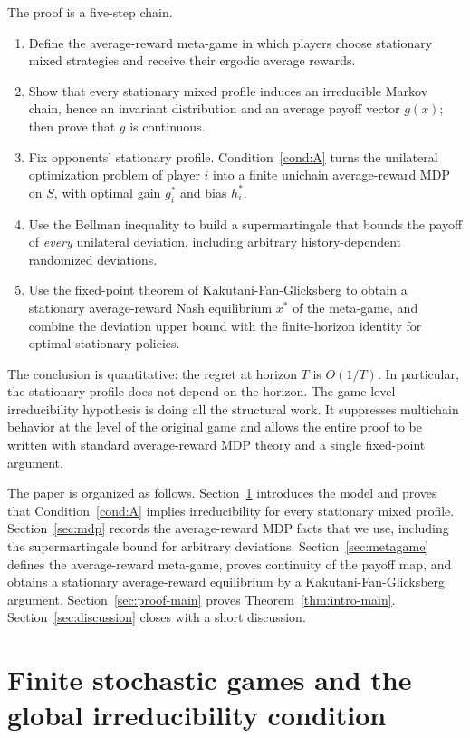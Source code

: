\documentclass[11pt]{article}
\theoremstyle{definition}
\newcommand{\1}{\mathbf{1}}
\begin{document}
The proof is a five-step chain.
\begin{enumerate}[label=\textup{(\arabic*)},leftmargin=2.8em]
\item Define the average-reward meta-game in which players choose stationary mixed strategies and receive their ergodic average rewards.
\item Show that every stationary mixed profile induces an irreducible Markov chain, hence an invariant distribution and an average payoff vector $g(x)$; then prove that $g$ is continuous.
\item Fix opponents' stationary profile. Condition~\ref{cond:A} turns the unilateral optimization problem of player $i$ into a finite unichain average-reward MDP on $S$, with optimal gain $g_i^*$ and bias $h_i^*$.
\item Use the Bellman inequality to build a supermartingale that bounds the payoff of \emph{every} unilateral deviation, including arbitrary history-dependent randomized deviations.
\item Use the fixed-point theorem of Kakutani-Fan-Glicksberg to obtain a stationary average-reward Nash equilibrium $x^*$ of the meta-game, and combine the deviation upper bound with the finite-horizon identity for optimal stationary policies.
\end{enumerate}

The conclusion is quantitative: the regret at horizon $T$ is $O(1/T)$. In particular, the stationary profile does not depend on the horizon. The game-level irreducibility hypothesis is doing all the structural work. It suppresses multichain behavior at the level of the original game and allows the entire proof to be written with standard average-reward MDP theory and a single fixed-point argument.

The paper is organized as follows. Section~\ref{sec:model} introduces the model and proves that Condition~\ref{cond:A} implies irreducibility for every stationary mixed profile. Section~\ref{sec:mdp} records the average-reward MDP facts that we use, including the supermartingale bound for arbitrary deviations. Section~\ref{sec:metagame} defines the average-reward meta-game, proves continuity of the payoff map, and obtains a stationary average-reward equilibrium by a Kakutani-Fan-Glicksberg argument. Section~\ref{sec:proof-main} proves Theorem~\ref{thm:intro-main}. Section~\ref{sec:discussion} closes with a short discussion.

\section{Finite stochastic games and the global irreducibility condition}\label{sec:model}
\end{document}
